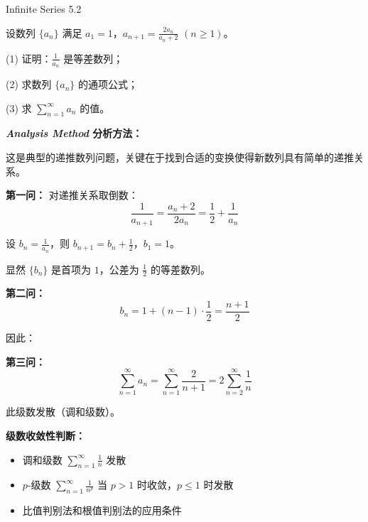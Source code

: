 \documentclass{ctexart}
\newcommand{\important}[1]{\textcolor{crimsonred}{\textbf{#1}}}
\begin{document}
\newpage

\begin{center}
    \begin{chaptertitle}{\faInfinity}{Infinite Series 5.2}
    \end{chaptertitle}
\end{center}

\begin{summarybox}{5.1}
设数列 $\{a_n\}$ 满足 $a_1 = 1$，$a_{n+1} = \frac{2a_n}{a_n + 2}$ $(n \geq 1)$。

(1) 证明：$\frac{1}{a_n}$ 是等差数列；

(2) 求数列 $\{a_n\}$ 的通项公式；

(3) 求 $\sum_{n=1}^{\infty} a_n$ 的值。
\end{summarybox}

\begin{formulabox}
\textbf{\color{elegantpurple}\textit{Analysis Method} \quad 分析方法：}

这是典型的递推数列问题，关键在于找到合适的变换使得新数列具有简单的递推关系。

\textbf{第一问：} 对递推关系取倒数：
$$\frac{1}{a_{n+1}} = \frac{a_n + 2}{2a_n} = \frac{1}{2} + \frac{1}{a_n}$$

设 $b_n = \frac{1}{a_n}$，则 $b_{n+1} = b_n + \frac{1}{2}$，$b_1 = 1$。

显然 $\{b_n\}$ 是首项为 $1$，公差为 $\frac{1}{2}$ 的等差数列。

\textbf{第二问：} 
$$b_n = 1 + (n-1) \cdot \frac{1}{2} = \frac{n+1}{2}$$

因此：

\textbf{第三问：} 
$$\sum_{n=1}^{\infty} a_n = \sum_{n=1}^{\infty} \frac{2}{n+1} = 2\sum_{n=2}^{\infty} \frac{1}{n}$$

此级数发散（调和级数）。
\end{formulabox}

\begin{exercisebox}
\important{级数收敛性判断：}
\begin{itemize}[leftmargin=15pt, itemsep=5pt]
    \item 调和级数 $\sum_{n=1}^{\infty} \frac{1}{n}$ 发散
    \item $p$-级数 $\sum_{n=1}^{\infty} \frac{1}{n^p}$ 当 $p > 1$ 时收敛，$p \leq 1$ 时发散
    \item 比值判别法和根值判别法的应用条件
\end{itemize}
\end{exercisebox}

\setcounter{page}{150}
\end{document}
